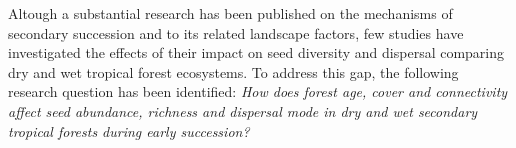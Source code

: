 



Altough a substantial research has been published on the mechanisms of secondary succession and to its related landscape factors, few studies have investigated the effects of their impact on seed diversity and dispersal comparing dry and wet tropical forest ecosystems. To address this gap, the following research question has been identified: \textit{How does forest age, cover and connectivity affect seed abundance, richness and dispersal mode in dry and wet secondary tropical forests during early succession?}



